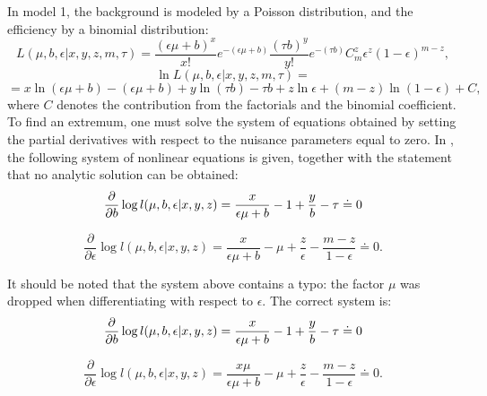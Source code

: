 \documentclass[12pt]{article}
\begin{document}
In model 1, the background is modeled by a Poisson distribution, and the efficiency by a binomial distribution:
$$L(\mu, b, \epsilon | x, y, z, m, \tau) = \frac{\left(\epsilon \mu + b\right)^x}{x!} e^{-\left(\epsilon \mu + b\right)} \frac{\left(\tau b\right)^y}{y!} e^{-\left(\tau b\right)} C_m^z \epsilon^z \left(1 - \epsilon\right)^{m-z} ,$$
$$\ln L(\mu, b, \epsilon | x, y, z, m, \tau) = $$
$$ = x\ln \left(\epsilon \mu + b\right) -\left(\epsilon \mu + b\right) + y\ln \left(\tau b\right) - \tau b + z \ln \epsilon + \left(m - z\right) \ln \left(1 - \epsilon\right) + C ,$$
where $C$ denotes the contribution from the factorials and the binomial coefficient.
To find an extremum, one must solve the system of equations obtained by setting the partial derivatives with respect to the nuisance parameters equal to zero.
In \cite{Rolke_paper}, the following system of nonlinear equations is given, together with the statement that no analytic solution can be obtained:
\begin{equation*}
    \frac{\partial }{\partial b}\log l(\mu ,b,\epsilon|x,y,z)=\frac{x}{\epsilon\mu +b}-1+\frac{%
    y}{b}-\tau \doteq 0
\end{equation*}
    
\begin{equation*}
    \frac{\partial }{\partial \epsilon}\log l(\mu ,b,\epsilon|x,y,z)=\frac{x}{\epsilon\mu +b}-\mu +%
    \frac{z}{\epsilon}-\frac{m-z}{1-\epsilon}\doteq 0 .
\end{equation*}

It should be noted that the system above contains a typo: the factor $\mu$ was dropped when differentiating with respect to $\epsilon$. The correct system is:
\begin{equation} \label{partial_b_eq}
    \frac{\partial }{\partial b}\log l(\mu ,b,\epsilon|x,y,z)=\frac{x}{\epsilon\mu +b}-1+\frac{%
    y}{b}-\tau \doteq 0
\end{equation}
    
\begin{equation} \label{partial_eff_eq}
    \frac{\partial }{\partial \epsilon}\log l(\mu ,b,\epsilon|x,y,z)=\frac{x \mu}{\epsilon\mu +b}-\mu +%
    \frac{z}{\epsilon}-\frac{m-z}{1-\epsilon}\doteq 0 .
\end{equation}
\end{document}
